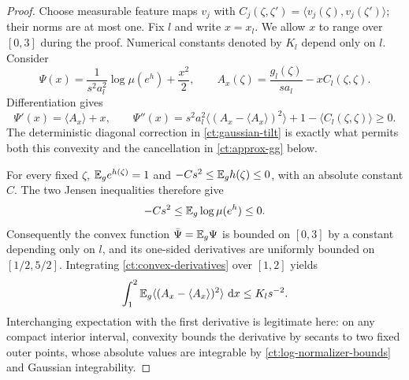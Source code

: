 \begin{proof}
Choose measurable feature maps $v_j$ with
$C_j(\zeta,\zeta')=\langle v_j(\zeta),v_j(\zeta')\rangle$; their
norms are at most one.  Fix $l$ and write $x=x_l$.  We allow $x$ to range over
$[0,3]$ during the proof.  Numerical constants denoted by $K_l$
depend only on $l$.  Consider
\[
 \Psi(x)=\frac{1}{s^2a_l^2}\log\mu(e^h)+\frac{x^2}{2},
 \qquad
 A_x(\zeta)=\frac{g_l(\zeta)}{sa_l}-xC_l(\zeta,\zeta).
\]
Differentiation gives
\begin{equation}\label{ct:convex-derivatives}
 \Psi'(x)=\langle A_x\rangle+x,
 \qquad
 \Psi''(x)=s^2a_l^2\langle(A_x-\langle A_x\rangle)^2\rangle
                 +1-\langle C_l(\zeta,\zeta)\rangle\ge0.
\end{equation}
The deterministic diagonal correction in \eqref{ct:gaussian-tilt}
is exactly what permits both this convexity and the cancellation in
\eqref{ct:approx-gg} below.

For every fixed $\zeta$, $\mathbb E_g e^{h(\zeta)}=1$ and
$-Cs^2\le\mathbb E_g h(\zeta)\le0$, with an absolute constant $C$.
The two Jensen inequalities therefore give
\begin{equation}\label{ct:log-normalizer-bounds}
       -Cs^2\le\mathbb E_g\log\mu(e^h)\le0.
\end{equation}
Consequently the convex function $\bar\Psi=\mathbb E_g\Psi$ is bounded on
$[0,3]$ by a constant depending only on $l$, and its one-sided
derivatives are uniformly bounded on $[1/2,5/2]$.  Integrating
\eqref{ct:convex-derivatives} over $[1,2]$ yields
\begin{equation}\label{ct:thermal-variance}
 \int_1^2\mathbb E_g\langle(A_x-\langle A_x\rangle)^2\rangle\,\,\mathrm d x
                         \le K_l s^{-2}.
\end{equation}
Interchanging expectation with the first derivative is legitimate here:
on any compact interior interval, convexity bounds the derivative by
secants to two fixed outer points, whose absolute values are integrable
by \eqref{ct:log-normalizer-bounds} and Gaussian integrability.


\end{proof}
